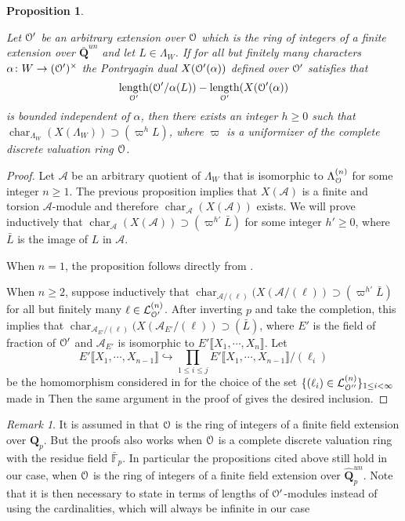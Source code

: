 \documentclass[leqno]{amsart}
\newtheorem{prop}[thm]{Proposition}
\theoremstyle{definition}
\theoremstyle{remark}
\newtheorem{rem}[thm]{Remark}
\newcommand{\eo}{\EuScript{O}}
\newcommand{\fF}{\mathbb{F}} %
\newcommand{\Q}{{\mathbf{Q}}}
\newcommand{\Qp}{\mathbf{Q}_p}
\DeclareMathOperator{\length}{length}
\DeclareMathOperator{\car}{char}
\newcommand{\lin}[1]{\mathcal{L}^{(#1)}}
\newcommand{\Lda}[1]{\Lambda^{(#1)}}
\begin{document}
\begin{prop}\label{prop:specialize}

Let $\eo'$ be an arbitrary extension over $\eo$
which is the ring of integers 
of a finite extension over $\bar{\Q}^{un}$
and let $L\in \Lambda_W$.
If for all but finitely many characters
$\alpha\colon W\to (\eo')^\times$
the Pontryagin dual $X(\eo'(\alpha))$ defined 
over $\eo'$ satisfies that
\[
    \length_{\eo'}(\eo'/\alpha(L))-
    \length_{\eo'}(X(\eo'(\alpha))
\]
is bounded independent of $\alpha$,
then there exists an integer $h\geq 0$
such that 
$\car_{\Lambda_W}(X(\Lambda_W))\supset (\varpi^hL)$,
where $\varpi$ is a uniformizer 
of the complete discrete valuation ring $\eo$.

\end{prop}

\begin{proof}

Let $\mathcal{A}$
be an arbitrary quotient of $\Lambda_W$
that is isomorphic to $\Lda{n}_{\eo}$
for some integer $n\geq 1$.
The previous proposition implies that
$X(\mathcal{A})$ is a finite and torsion 
$\mathcal{A}$-module
and therefore $\car_{\mathcal{A}}(X(\mathcal{A}))$ exists.
We will prove inductively that
$\car_{\mathcal{A}}(X(\mathcal{A}))\supset 
(\varpi^{h'} \bar{L})$
for some integer $h'\geq 0$,
where $\bar{L}$ is the image of $L$ in $\mathcal{A}$.

When $n=1$, 
the proposition follows directly
from \cite[Prop 3.11]{Och05}.

When $n\geq 2$, suppose inductively that
$\car_{\mathcal{A}/(\ell)}(X(\mathcal{A}/(\ell))\supset 
(\varpi^{h'} \bar{L})$ for all but finitely many 
$\ell\in \lin{n}_{\eo'}$.
After inverting $p$ and take the completion,
this implies that 
$\car_{\mathcal{A}_{E'}/(\ell)}(X(\mathcal{A}_{E'}/(\ell))
\supset (\bar{L})$,
where $E'$ is the field of fraction of $\eo'$
and  $\mathcal{A}_{E'}$ is isomorphic to
$E'\llbracket X_1,\cdots,X_n\rrbracket$.
Let 
\[
    E'\llbracket X_1,\cdots, X_{n-1}\rrbracket 
    \hookrightarrow
    \prod_{1\leq i\leq j}
    E'\llbracket X_1,\cdots, X_{n-1}\rrbracket/(\ell_i)
\]
be the homomorphism considered in  \cite[p.134]{Och05}
for the choice of the set
$\{(\ell_i)\in \lin{n}_{\eo''}\}_{1\leq i<\infty}$
made in \cite[Claim 3.10]{Och05}
Then the same argument in the proof of 
\cite[Prop 3.6]{Och05}
gives the desired inclusion.

\end{proof}


\begin{rem}
It is assumed in \cite{Och05} that
$\eo$ is the ring of integers
of a finite field extension over $\Qp$.
But the proofs also works when
$\eo$ is a complete discrete valuation ring 
with the residue field $\bar{\fF}_p$.
In particular the propositions cited above
still hold in our case,
when $\eo$ is the ring of integers
of a finite field extension over $\widehat{\Q}_p^{un}$.
Note that it is then necessary to state
\cite[Prop 3.11]{Och05}
in terms of lengths of $\eo'$-modules
instead of using the cardinalities,
which will always be infinite in our case
\end{rem}
\end{document}
